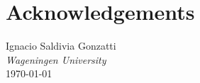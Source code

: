 \chapter*{Acknowledgements}
\noindent






\vspace{2em}
\noindent
Ignacio Saldivia Gonzatti \\
\emph{Wageningen University} \\
\today